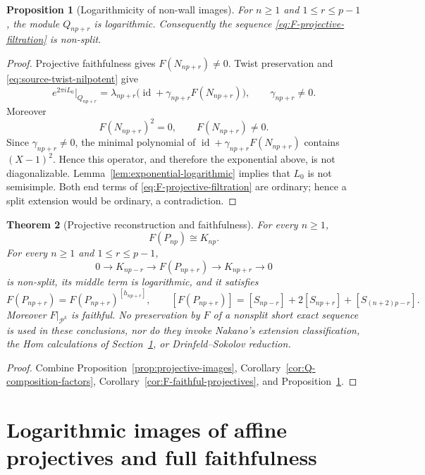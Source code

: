 \documentclass[12pt,leqno]{amsart}
\numberwithin{equation}{section}
\newtheorem{thm}{Theorem}[section]
\newtheorem{prop}[thm]{Proposition}
\newcommand{\id}{\operatorname{id}}
\begin{document}
\begin{prop}[Logarithmicity of non-wall images]\label{prop:Q-logarithmic}
For $n\ge1$ and $1\le r\le p-1$, the module $Q_{np+r}$ is logarithmic.
Consequently the sequence \eqref{eq:F-projective-filtration} is non-split.
\end{prop}

\begin{proof}
Projective faithfulness gives $F(N_{np+r})\ne0$.  Twist preservation and
\eqref{eq:source-twist-nilpotent} give
\[
 e^{2\pi iL_0}|_{Q_{np+r}}
 =\lambda_{np+r}
 \bigl(\id+\gamma_{np+r}F(N_{np+r})\bigr),
 \qquad \gamma_{np+r}\ne0.
\]
Moreover
\[
 F(N_{np+r})^2=0,\qquad F(N_{np+r})\ne0.
\]
Since $\gamma_{np+r}\ne0$, the minimal polynomial of
$\id+\gamma_{np+r}F(N_{np+r})$ contains $(X-1)^2$.  Hence this operator,
and therefore the exponential above, is not diagonalizable.  Lemma~\ref{lem:exponential-logarithmic} implies that
$L_0$ is not semisimple.  Both end terms of
\eqref{eq:F-projective-filtration} are ordinary; hence a split extension
would be ordinary, a contradiction.
\end{proof}

\begin{thm}[Projective reconstruction and faithfulness]\label{thm:projective-control}
For every $n\ge1$,
\[
 F(P_{np})\cong K_{np}.
\]
For every $n\ge1$ and $1\le r\le p-1$,
\[
 0\to K_{np-r}\to F(P_{np+r})\to K_{np+r}\to0
\]
is non-split, its middle term is logarithmic, and it satisfies
\[
 F(P_{np+r})=F(P_{np+r})^{[h_{np+r}]},
\qquad
 [F(P_{np+r})]
 =[S_{np-r}]+2[S_{np+r}]+[S_{(n+2)p-r}].
\]
Moreover $F|_{\mathcal P^k}$ is faithful.  No preservation by $F$ of a
nonsplit short exact sequence is used in these conclusions, nor do they
invoke Nakano's extension classification, the Hom calculations of
Section~\ref{sec:fullness}, or Drinfeld--Sokolov reduction.
\end{thm}

\begin{proof}
Combine Proposition~\ref{prop:projective-images},
Corollary~\ref{cor:Q-composition-factors},
Corollary~\ref{cor:F-faithful-projectives}, and
Proposition~\ref{prop:Q-logarithmic}.
\end{proof}


\section{Logarithmic images of affine projectives and full faithfulness}\label{sec:fullness}
\end{document}
